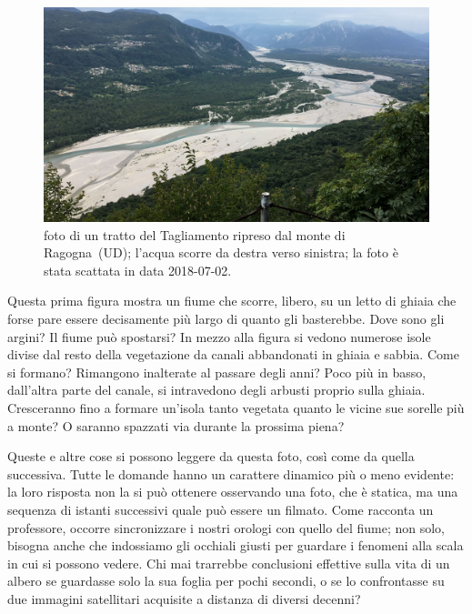 

\begin{figure}[h]
	\centering
	\includegraphics[width=\textwidth]{files/foto_flagogna.jpg}
	\caption[foto di un tratto del Tagliamento ripreso dal monte di Ragogna]{foto di un tratto del Tagliamento ripreso dal monte di Ragogna~(UD); l'acqua scorre da destra verso sinistra; la foto è stata scattata in data 2018-07-02.
	}
	\label{fig:foto-ragogna}
\end{figure}



Questa prima figura mostra un fiume che scorre, libero, su un letto di ghiaia che forse pare essere decisamente più largo di quanto gli basterebbe. 
Dove sono gli argini? Il fiume può spostarsi? 
%
In mezzo alla figura si vedono numerose isole divise dal resto della vegetazione da canali abbandonati in ghiaia e sabbia. 
Come si formano? Rimangono inalterate al passare degli anni? 
%
Poco più in basso, dall'altra parte del canale, si intravedono degli arbusti proprio sulla ghiaia. 
Cresceranno fino a formare un'isola tanto vegetata quanto le vicine sue sorelle più a monte? O saranno spazzati via durante la prossima piena?

\medskip
Queste e altre cose si possono leggere da questa foto, così come da quella successiva. Tutte le domande hanno un carattere dinamico più o meno evidente: la loro risposta non la si può ottenere osservando una foto, che è statica, ma una sequenza di istanti successivi quale può essere un filmato.
Come racconta un professore, occorre sincronizzare i nostri orologi con quello del fiume; non solo, bisogna anche che indossiamo gli occhiali giusti per guardare i fenomeni alla scala in cui si possono vedere. Chi mai trarrebbe conclusioni effettive sulla vita di un albero se guardasse solo la sua foglia per pochi secondi, o se lo confrontasse su due immagini satellitari acquisite a distanza di diversi decenni?


